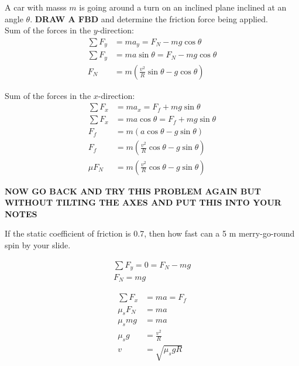 \begin{problem}
	A car with masss $m$ is going around a turn on an inclined plane inclined at an angle $\theta$. \textbf{DRAW A FBD} and determine the friction force being applied.\\


	Sum of the forces in the $y$-direction:
	$$
	\begin{aligned}
		\sum F_y &= ma_y = F_N - mg\cos\theta\\
		\sum F_y &= ma\sin\theta = F_N - mg\cos\theta\\
		F_N &= m\left(\frac{v^2}{R}\sin\theta - g\cos\theta\right)
	\end{aligned}
	$$


	Sum of the forces in the $x$-direction:
	$$
	\begin{aligned}
		\sum F_x &= ma_x = F_f + mg\sin\theta\\
		\sum F_x &= ma\cos\theta = F_f + mg\sin\theta\\
		F_f &= m(a\cos\theta - g\sin\theta)\\
		F_f &= m\left(\frac{v^2}{R}\cos\theta - g\sin\theta\right)\\
		\mu F_N &= m\left(\frac{v^2}{R}\cos\theta - g\sin\theta\right)
	\end{aligned}
	$$

	\textbf{NOW GO BACK AND TRY THIS PROBLEM AGAIN BUT WITHOUT TILTING THE AXES AND PUT THIS INTO YOUR NOTES}
\end{problem}


\begin{problem}
	If the static coefficient of friction is 0.7, then how fast can a 5 m merry-go-round spin by your slide. 

	$$
	\begin{aligned}
		\sum F_y = 0 = F_N - mg\\
		F_N = mg
	\end{aligned}
	$$

	$$
	\begin{aligned}
		\sum F_x &= ma = F_f\\
		\mu_sF_N &= ma\\
		\mu_smg &= ma\\
		\mu_sg &= \frac{v^2}{R}\\
		v &= \sqrt{\mu_sgR}
	\end{aligned}
	$$
\end{problem}